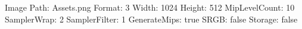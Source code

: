 Image Path: Assets\Textures\Robot.png
Format: 3
Width: 1024
Height: 512
MipLevelCount: 10
SamplerWrap: 2
SamplerFilter: 1
GenerateMips: true
SRGB: false
Storage: false